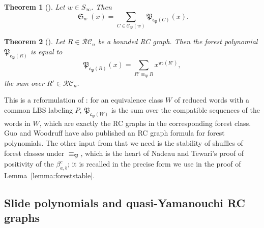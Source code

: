 \documentclass{amsart}
\newtheorem{theorem}{Theorem}[section]
\theoremstyle{definition}
\theoremstyle{remark}
\numberwithin{equation}{subsection}
\DeclareMathOperator{\sch}{\mathfrak{S}}
\newcommand{\wtt}{\mathtt{wt}}
\newcommand{\RC}{\mathcal{RC}}
\newcommand{\code}{\mathfrak{c}}
\newcommand{\forest}{\mathfrak{P}}
\newcommand{\fcode}{\mathfrak{c}_\forest}
\begin{document}
\begin{theorem}[{\cite[Theorem~1.4]{nadeau2024forest}}] \label{theorem:forestforest}
  Let $w\in S_\infty$. Then
  $$\sch_w(x) = \sum_{C\in \mathcal{C}_\forest(w)} \forest_{\code_\forest(C)}(x).$$
\end{theorem}

\begin{theorem}[{\cite[Theorem~\ref*{B-theorem:forestformula}(I)]{samuelbialgebra}}]\label{theorem:forestformula}
Let $R\in \RC_n$ be a bounded RC graph. Then the forest polynomial $\forest_{\fcode(R)}$ is equal to
$$\forest_{\fcode(R)}(x)=\sum_{R'\equiv_{\forest} R} x^{\wtt(R')},$$
the sum over $R'\in\RC_n$.
\end{theorem}

This is a reformulation of \cite[Proposition~5.10]{nadeau2024forest}: for an equivalence class $W$ of reduced words with a common LBS labeling $P$, $\forest_{\code_\forest(W)}$ is the sum over the compatible sequences of the words in $W$, which are exactly the RC graphs in the corresponding forest class. Guo and Woodruff \cite{guo2026forest} have also published an RC graph formula for forest polynomials. The other input from \cite{nadeau2024forest} that we need is the stability of shuffles of forest classes under $\equiv_\forest$, which is the heart of Nadeau and Tewari's proof of positivity of the $\beta_{a,b}^c$; it is recalled in the precise form we use in the proof of Lemma~\ref{lemma:foreststable}.

\subsection{Slide polynomials and quasi-Yamanouchi RC graphs}\label{section:slidebackground}
\end{document}
